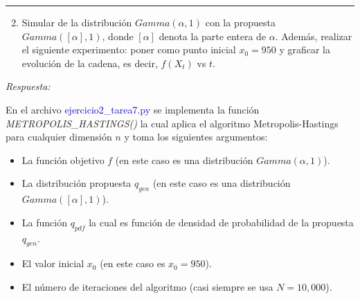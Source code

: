 \newpage
{\color{lightgray} \hrule}
\begin{enumerate} \setcounter{enumi}{1}
	\item Simular de la distribución $Gamma(\alpha,1)$ con la propuesta $Gamma([\alpha],1)$, donde $[\alpha]$ denota la parte entera de $\alpha$. Además, realizar el siguiente experimento: poner como punto inicial $x_0 = 950$ y graficar la evolución de la cadena, es decir, $f(X_t)$ vs $t$.
\end{enumerate}

\textcolor{BrickRed}{\it Respuesta:}

En el archivo \textcolor{mediumblue}{ejercicio2\_tarea7.py} se implementa la función \textit{METROPOLIS\_HASTINGS()} la cual aplica el algoritmo Metropolis-Hastings para cualquier dimensión $n$ y toma los siguientes argumentos:
\begin{itemize}
	\item La función objetivo $f$ (en este caso es una distribución $Gamma(\alpha,1)$).
	\item La distribución propuesta $q_{gen}$ (en este caso es una distribución $Gamma([\alpha],1)$).
	\item La función $q_{pdf}$ la cual es función de densidad de probabilidad de la propuesta $q_{gen}$.
	\item El valor inicial $x_0$ (en este caso es $x_{0}=950$).
	\item El número de iteraciones del algoritmo (casi siempre se usa $N = 10,000$).
\end{itemize}

